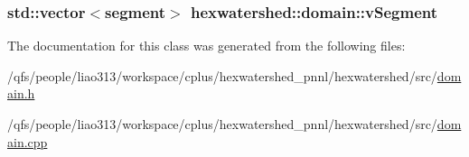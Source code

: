 \hypertarget{classhexwatershed_1_1domain_ac4d3bbe063870f14c2c2560e43c8d01a}{
\subsubsection[{v\-Segment}]{\setlength{\rightskip}{0pt plus 5cm}std\-::vector$<${\bf segment}$>$ hexwatershed\-::domain\-::v\-Segment}}\label{classhexwatershed_1_1domain_ac4d3bbe063870f14c2c2560e43c8d01a}


The documentation for this class was generated from the following files\-:\begin{DoxyCompactItemize}
\item 
/qfs/people/liao313/workspace/cplus/hexwatershed\-\_\-pnnl/hexwatershed/src/\hyperlink{domain_8h}{domain.\-h}\item 
/qfs/people/liao313/workspace/cplus/hexwatershed\-\_\-pnnl/hexwatershed/src/\hyperlink{domain_8cpp}{domain.\-cpp}\end{DoxyCompactItemize}
